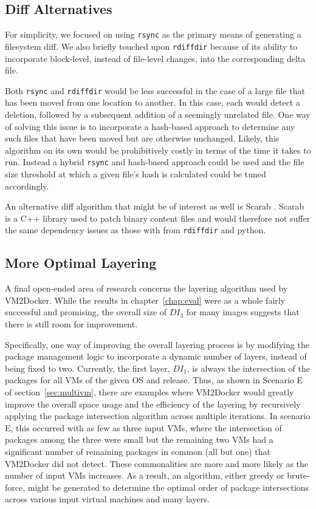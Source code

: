 \subsection{Diff Alternatives}
For simplicity, we focused on using \texttt{rsync} as the primary means of generating a filesystem diff. We also briefly touched upon \texttt{rdiffdir} because of its ability to incorporate block-level, instead of file-level changes, into the corresponding delta file.

Both \texttt{rsync} and \texttt{rdiffdir} would be less successful in the case of a large file that has been moved from one location to another. In this case, each would detect a deletion, followed by a subsequent addition of a seemingly unrelated file. One way of solving this issue is to incorporate a hash-based approach to determine any such files that have been moved but are otherwise unchanged. Likely, this algorithm on its own would be prohibitively costly in terms of the time it takes to run. Instead a hybrid \texttt{rsync} and hash-based approach could be used and the file size threshold at which a given file's hash is calculated could be tuned accordingly.

An alternative diff algorithm that might be of interest as well is Scarab \cite{scarab}. Scarab is a C++ library used to patch binary content files and would therefore not suffer the same dependency issues as those with from \texttt{rdiffdir} and python.

\subsection{More Optimal Layering}
A final open-ended area of research concerns the layering algorithm used by VM2Docker. While the results in chapter~\ref{chap:eval} were as a whole fairly successful and promising, the overall size of $DI_3$ for many images suggests that there is still room for improvement.

Specifically, one way of improving the overall layering process is by modifying the package management logic to incorporate a dynamic number of layers, instead of being fixed to two. Currently, the first layer, $DI_1$, is always the intersection of the packages for all VMs of the given OS and release. Thus, as shown in Scenario E of section~\ref{sec:multivm}, there are examples where VM2Docker would greatly improve the overall space usage and the efficiency of the layering by recursively applying the package intersection algorithm across multiple iterations. In scenario E, this occurred with as few as three input VMs, where the intersection of packages among the three were small but the remaining two VMs had a significant number of remaining packages in common (all but one) that VM2Docker did not detect. These commonalities are more and more likely as the number of input VMs increases. As a result, an algorithm, either greedy or brute-force, might be generated to determine the optimal order of package intersections across various input virtual machines and many layers.

